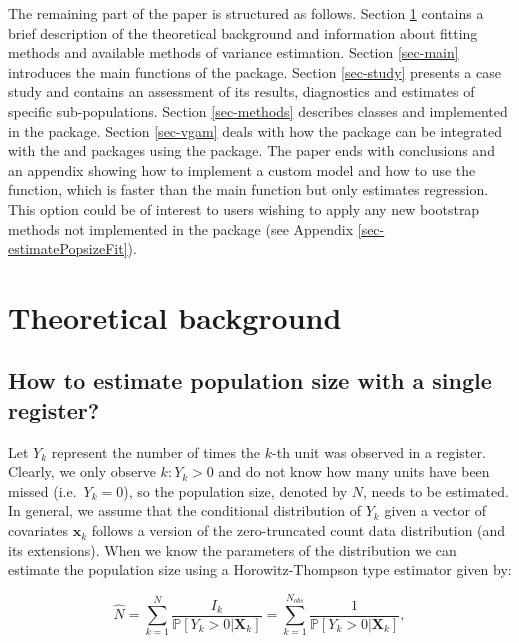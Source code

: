 \documentclass[
]{jss}
\newcommand{\1}{\mathcal{I}} \newcommand{\bZero}{\boldsymbol{0}}
\begin{document}
The remaining part of the paper is structured as follows. Section
\ref{sec-theory} contains a brief description of the theoretical
background and information about fitting methods and available methods
of variance estimation. Section \ref{sec-main} introduces the main
functions of the package. Section \ref{sec-study} presents a case study
and contains an assessment of its results, diagnostics and estimates of
specific sub-populations. Section \ref{sec-methods} describes classes
and  implemented in the package. Section \ref{sec-vgam}
deals with how the package can be integrated with the  and
 packages using the  package. The
paper ends with conclusions and an appendix showing how to implement a
custom model and how to use the  function,
which is faster than the main function but only estimates regression.
This option could be of interest to users wishing to apply any new
bootstrap methods not implemented in the package (see Appendix
\ref{sec-estimatePopsizeFit}).

\section{Theoretical background}\label{sec-theory}

\subsection{How to estimate population size with a single
register?}\label{how-to-estimate-population-size-with-a-single-register}

Let \(Y_{k}\) represent the number of times the \(k\)-th unit was
observed in a register. Clearly, we only observe \(k:Y_{k}>0\) and do
not know how many units have been missed (i.e.~\(Y_{k}=0\)), so the
population size, denoted by \(N\), needs to be estimated. In general, we
assume that the conditional distribution of \(Y_{k}\) given a vector of
covariates \(\boldsymbol{x}_{k}\) follows a version of the
zero-truncated count data distribution (and its extensions). When we
know the parameters of the distribution we can estimate the population
size using a Horowitz-Thompson type estimator given by:

\begin{equation}
\hat{N}=
\sum_{k=1}^{N}\frac{I_{k}}{\mathbb{P}[Y_{k}>0|\boldsymbol{X}_{k}]}=
\sum_{k=1}^{N_{obs}}\frac{1}{\mathbb{P}[Y_{k}>0|\boldsymbol{X}_{k}]},
\label{eq-ht-estimator}
\end{equation}
\end{document}
